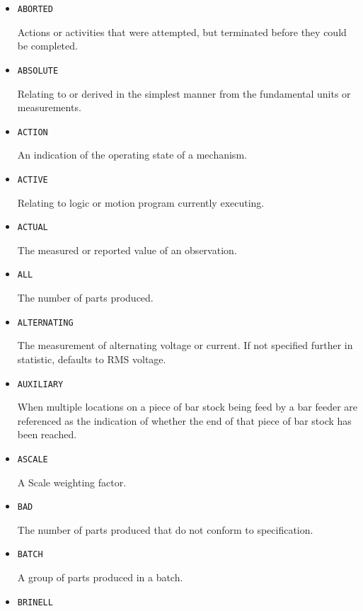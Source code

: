 \begin{itemize}


\item \texttt{ABORTED}  

Actions or activities that were attempted, but terminated before they could be completed.




\item \texttt{ABSOLUTE}  

Relating to or derived in the simplest manner from the fundamental units or measurements.


\item \texttt{ACTION}  

An indication of the operating state of a mechanism.


\item \texttt{ACTIVE}  

Relating to logic or motion program currently executing.


\item \texttt{ACTUAL}  

The measured or reported value of an \gls{observation}.


\item \texttt{ALL}  

The number of parts produced.


\item \texttt{ALTERNATING}  

The measurement of alternating voltage or current.   If not specified further in statistic, defaults to RMS voltage. 


\item \texttt{AUXILIARY}  

When multiple locations on a piece of bar stock being feed by a bar feeder are referenced as the indication of whether the end of that piece of bar stock has been reached.


\item \texttt{A\textunderscore SCALE}  

A Scale weighting factor.


\item \texttt{BAD}  

The number of parts produced that do not conform to specification.


\item \texttt{BATCH}  

A group of parts produced in a batch.


\item \texttt{BRINELL}  


\end{itemize}
